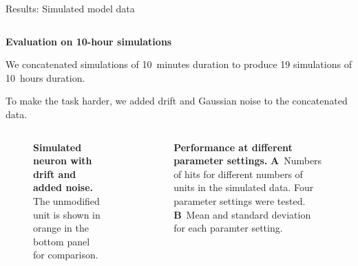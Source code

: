\documentclass{beamer}
\renewcommand{\emph}{\textbf}
\newenvironment{wideitemize}{\itemize\addtolength{\itemsep}{.2em}\addtolength{\labelsep}{.1ex}}{\enditemize}
\begin{document}
\begin{frame}[t]
\begin{columns}[T]
\begin{column}{.49\linewidth}
\begin{block}{Results: Simulated model data}
\begin{columns}[T]
\begin{column}{.95\linewidth}
\begin{columns}[T]
\begin{column}{.48\linewidth}
\end{column}
\end{columns}

\vspace{2em}
\emph{Evaluation on 10-hour simulations}
\begin{wideitemize}
\item We concatenated simulations of 10~minutes duration to produce 19 simulations of 10~hours duration.
\item To make the task harder, we added drift and Gaussian noise to the concatenated data.
\end{wideitemize}
\begin{columns}[T]
\begin{column}{.47\linewidth}
\begin{figure}
\begin{center}
\end{center}
\caption{\emph{Simulated neuron with drift and added noise.} The unmodified unit is shown in orange in the bottom panel for comparison.}
\end{figure}
\end{column}

\begin{column}{.47\linewidth}
\begin{figure}
\begin{center}
\end{center}
\caption{\emph{Performance at different parameter settings.} \textbf{A}~Numbers of hits for different numbers of units in the simulated data. Four parameter settings were tested. \textbf{B}~Mean and standard deviation for each paramter setting.}
\end{figure}
\vspace{-1.6em}
\end{column}
\end{columns}
\end{column}
\end{columns}
\end{block}


\end{column} %



\end{columns}
\end{frame}
\end{document}
